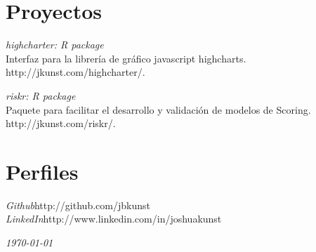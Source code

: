 \documentclass[margin]{res}
\begin{document}
\begin{resume}
\vspace{1cm}

\newpage

\section{Proyectos}


    {\sl highcharter: R package}\\
    Interfaz para la librería de gráfico javascript highcharts.\\
    http://jkunst.com/highcharter/.
    
    {\sl riskr: R package}\\
    Paquete para facilitar el desarrollo y validación de modelos
    de Scoring.\\
    http://jkunst.com/riskr/.

\vspace{1cm}

\section{Perfiles}
    
    {\sl Github}\hfill http://github.com/jbkunst\\
    
    {\sl LinkedIn}\hfill http://www.linkedin.com/in/joshuakunst

\vspace{1cm}


\end{resume}

\vspace{0.5cm}

\hfill {\sl \today}
\end{document}
